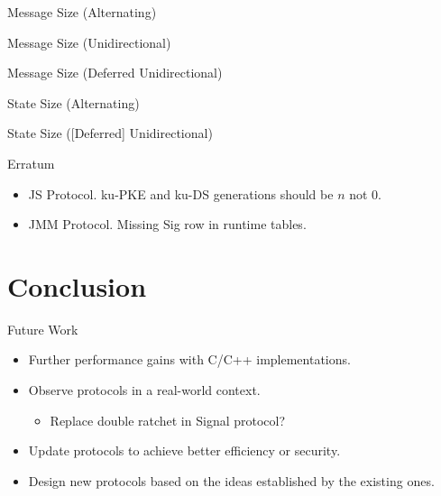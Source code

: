 \documentclass{beamer}
\begin{document}
\begin{frame}{Message Size (Alternating)}
   \begin{figure}[H]
    \centering
     
  \end{figure}
\end{frame}

\begin{frame}{Message Size (Unidirectional)}
   \begin{figure}[H]
    \centering
     
  \end{figure}
\end{frame}

\begin{frame}{Message Size (Deferred Unidirectional)}
   \begin{figure}[H]
    \centering
     
  \end{figure}
\end{frame}

\begin{frame}{State Size (Alternating)}
   \begin{figure}[H]
    \centering
     
  \end{figure}
\end{frame}

\begin{frame}{State Size ([Deferred] Unidirectional)}
   \begin{figure}[H]
    \centering
     
  \end{figure}
\end{frame}

\begin{frame}{Erratum}
  \begin{itemize}
  \item JS Protocol. ku-PKE and ku-DS generations should be $n$ not $0$.
  \item JMM Protocol. Missing Sig row in runtime tables.
  \end{itemize}
\end{frame}

\section{Conclusion}
\label{sec:conclusion}

\begin{frame}{Future Work}
  \begin{itemize}
  \item Further performance gains with C/C++ implementations.
  \item Observe protocols in a real-world context.
    \begin{itemize}
    \item Replace double ratchet in Signal protocol?
    \end{itemize}
  \item Update protocols to achieve better efficiency or security.
  \item Design new protocols based on the ideas established by the existing ones.
  \end{itemize}
\end{frame}
\end{document}
